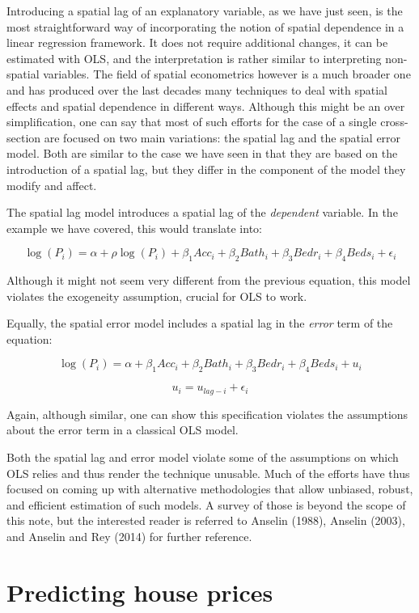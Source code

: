 \documentclass[
  letterpaper,
  DIV=11,
  numbers=noendperiod,
  oneside]{scrreprt}
\begin{document}
Introducing a spatial lag of an explanatory variable, as we have just
seen, is the most straightforward way of incorporating the notion of
spatial dependence in a linear regression framework. It does not require
additional changes, it can be estimated with OLS, and the interpretation
is rather similar to interpreting non-spatial variables. The field of
spatial econometrics however is a much broader one and has produced over
the last decades many techniques to deal with spatial effects and
spatial dependence in different ways. Although this might be an over
simplification, one can say that most of such efforts for the case of a
single cross-section are focused on two main variations: the spatial lag
and the spatial error model. Both are similar to the case we have seen
in that they are based on the introduction of a spatial lag, but they
differ in the component of the model they modify and affect.

The spatial lag model introduces a spatial lag of the \emph{dependent}
variable. In the example we have covered, this would translate into:

\[
\log(P_i) = \alpha + \rho \log(P_i) + \beta_1 Acc_i + \beta_2 Bath_i + \beta_3 Bedr_i + \beta_4 Beds_i + \epsilon_i
\]

Although it might not seem very different from the previous equation,
this model violates the exogeneity assumption, crucial for OLS to work.

Equally, the spatial error model includes a spatial lag in the
\emph{error} term of the equation:

\[
\log(P_i) = \alpha + \beta_1 Acc_i + \beta_2 Bath_i + \beta_3 Bedr_i + \beta_4 Beds_i + u_i
\]

\[
u_i = u_{lag-i} + \epsilon_i
\]

Again, although similar, one can show this specification violates the
assumptions about the error term in a classical OLS model.

Both the spatial lag and error model violate some of the assumptions on
which OLS relies and thus render the technique unusable. Much of the
efforts have thus focused on coming up with alternative methodologies
that allow unbiased, robust, and efficient estimation of such models. A
survey of those is beyond the scope of this note, but the interested
reader is referred to Anselin (1988), Anselin (2003), and Anselin and
Rey (2014) for further reference.

\section{Predicting house prices}\label{predicting-house-prices}
\end{document}
